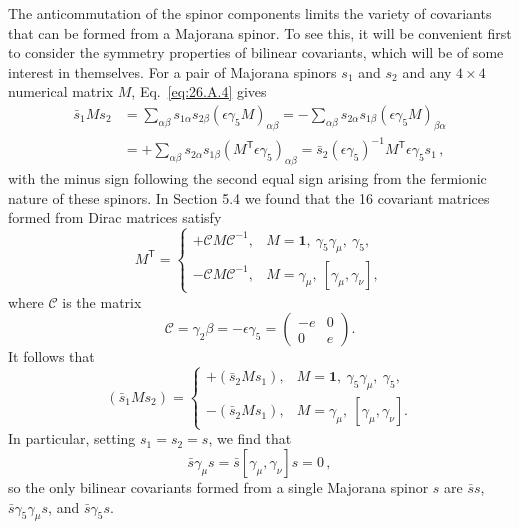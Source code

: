 The anticommutation of the spinor components limits the variety of covariants
that can be formed from a Majorana spinor. To see this, it will be convenient
first to consider the symmetry properties of bilinear covariants, which will
be of some interest in themselves. For a pair of Majorana spinors $s_1$ and
$s_2$ and any $4\times4$ numerical matrix $M$, Eq.~\eqref{eq:26.A.4} gives
\[
\begin{aligned}
  \bar{s}_1Ms_2
  &=\sum_{\alpha\beta}s_{1\alpha}s_{2\beta}
    (\epsilon\gamma_5M)_{\alpha\beta}
   =-\sum_{\alpha\beta}s_{2\alpha}s_{1\beta}
    (\epsilon\gamma_5M)_{\beta\alpha}
  \\
  &=+\sum_{\alpha\beta}s_{2\alpha}s_{1\beta}
    (M^{\mathsf T}\epsilon\gamma_5)_{\alpha\beta}
   =\bar{s}_2(\epsilon\gamma_5)^{-1}
    M^{\mathsf T}\epsilon\gamma_5s_1\,,
\end{aligned}
\]
with the minus sign following the second equal sign arising from the
fermionic nature of these spinors. In Section 5.4 we found that the 16
covariant matrices formed from Dirac matrices satisfy
\begin{equation}
  M^{\mathsf T}=
  \begin{cases}
    +\mathcal{C}M\mathcal{C}^{-1},
      &M=\mathbf{1},\ \gamma_5\gamma_\mu,\ \gamma_5,\\
    -\mathcal{C}M\mathcal{C}^{-1},
      &M=\gamma_\mu,\ [\gamma_\mu,\gamma_\nu],
  \end{cases}
  \tag{26.A.5}\label{eq:26.A.5}
\end{equation}
where $\mathcal{C}$ is the matrix
\begin{equation}
  \mathcal{C}=\gamma_2\beta=-\epsilon\gamma_5
  =
  \begin{pmatrix}
    -e&0\\
    0&e
  \end{pmatrix}.
  \tag{26.A.6}\label{eq:26.A.6}
\end{equation}
It follows that
\begin{equation}
  (\bar{s}_1Ms_2)=
  \begin{cases}
    +(\bar{s}_2Ms_1),
      &M=\mathbf{1},\ \gamma_5\gamma_\mu,\ \gamma_5,\\
    -(\bar{s}_2Ms_1),
      &M=\gamma_\mu,\ [\gamma_\mu,\gamma_\nu].
  \end{cases}
  \tag{26.A.7}\label{eq:26.A.7}
\end{equation}
In particular, setting $s_1=s_2=s$, we find that
\begin{equation}
  \bar{s}\gamma_\mu s=\bar{s}[\gamma_\mu,\gamma_\nu]s=0\,,
  \tag{26.A.8}\label{eq:26.A.8}
\end{equation}
so the only bilinear covariants formed from a single Majorana spinor $s$ are
$\bar{s}s$, $\bar{s}\gamma_5\gamma_\mu s$, and $\bar{s}\gamma_5s$.

